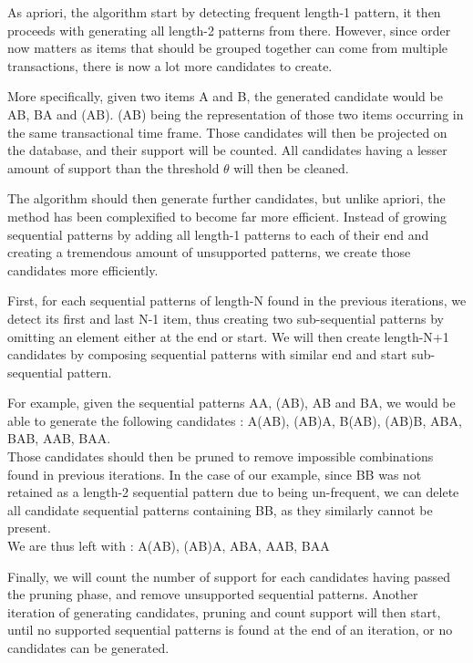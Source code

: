 \documentclass{eplmastersthesis}
\begin{document}
As apriori, the algorithm start by detecting frequent length-1 pattern, it then proceeds with generating all length-2 patterns from there. However, since order now matters as items that should be grouped together can come from multiple transactions, there is now a lot more candidates to create. \newline

More specifically, given two items A and B, the generated candidate would be AB, BA and (AB). (AB) being the representation of those two items occurring in the same transactional time frame. Those candidates will then be projected on the database, and their support will be counted. All candidates having a lesser amount of support than the threshold $\theta$ will then be cleaned. \newline

The algorithm should then generate further candidates, but unlike apriori, the method has been complexified to become far more efficient. Instead of growing sequential patterns by adding all length-1 patterns to each of their end and creating a tremendous amount of unsupported patterns, we create those candidates more efficiently. \newline

First, for each sequential patterns of length-N found in the previous iterations, we detect its first and last N-1 item, thus creating two sub-sequential patterns by omitting an element either at the end or start. We will then create length-N+1 candidates by composing sequential patterns with similar end and start sub-sequential pattern. \newline

For example, given the sequential patterns AA, (AB), AB and BA, we would be able to generate the following candidates : A(AB), (AB)A, B(AB), (AB)B, ABA, BAB, AAB, BAA. \\
Those candidates should then be pruned to remove impossible combinations found in previous iterations. In the case of our example, since BB was not retained as a length-2 sequential pattern due to being un-frequent, we can delete all candidate sequential patterns containing BB, as they similarly cannot be present. \\
We are thus left with : A(AB), (AB)A, ABA, AAB, BAA \newline

Finally, we will count the number of support for each candidates having passed the pruning phase, and remove unsupported sequential patterns. Another iteration of generating candidates, pruning and count support will then start, until no supported sequential patterns is found at the end of an iteration, or no candidates can be generated. \newline
\end{document}
